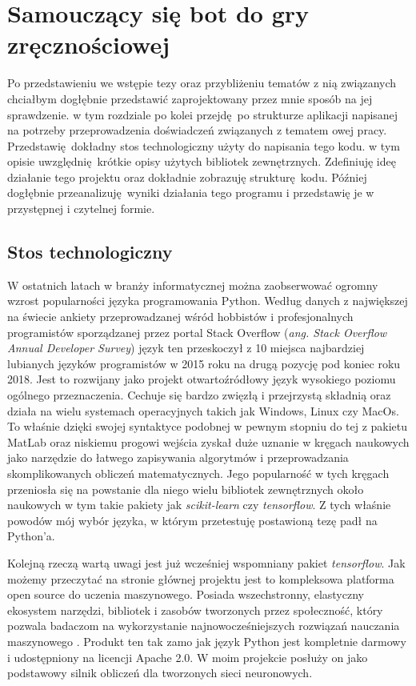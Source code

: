 \documentclass[12pt, oneside, a4paper]{report}
\begin{document}

\chapter{Samouczący się bot do gry zręcznościowej}

Po przedstawieniu we wstępie tezy oraz przybliżeniu tematów z nią związanych chciałbym dogłębnie przedstawić zaprojektowany przez mnie sposób na jej sprawdzenie. w tym rozdziale po kolei przejdę po strukturze aplikacji napisanej na potrzeby przeprowadzenia doświadczeń związanych z tematem owej pracy. Przedstawię dokładny stos technologiczny użyty do napisania tego kodu. w tym opisie uwzględnię krótkie opisy użytych bibliotek zewnętrznych. Zdefiniuję ideę działanie tego projektu oraz dokładnie zobrazuję strukturę kodu. Później dogłębnie przeanalizuję wyniki działania tego programu i przedstawię je w przystępnej i czytelnej formie.

\section{Stos technologiczny}

W ostatnich latach w branży informatycznej można zaobserwować ogromny wzrost popularności języka programowania Python. Według danych z największej na świecie ankiety przeprowadzanej wśród hobbistów i profesjonalnych programistów sporządzanej przez portal Stack Overflow (\textit{ang. Stack Overflow Annual Developer Survey}) \citep{stackoverflow-survey} język ten przeskoczył z 10 miejsca najbardziej lubianych języków programistów w 2015 roku na drugą pozycję pod koniec roku 2018. Jest to rozwijany jako projekt otwartoźródłowy język wysokiego poziomu ogólnego przeznaczenia. Cechuje się bardzo zwięzłą i przejrzystą składnią oraz działa na wielu systemach operacyjnych takich jak Windows, Linux czy MacOs. To właśnie dzięki swojej syntaktyce podobnej w pewnym stopniu do tej z pakietu MatLab oraz niskiemu progowi wejścia zyskał duże uznanie w kręgach naukowych jako narzędzie do łatwego zapisywania algorytmów i przeprowadzania skomplikowanych obliczeń matematycznych. Jego popularność w tych kręgach przeniosła się na powstanie dla niego wielu bibliotek zewnętrznych około naukowych w tym takie pakiety jak \textit{scikit-learn} czy \textit{tensorflow}. Z tych właśnie powodów mój wybór języka, w którym przetestuję postawioną tezę padł na Python'a.

Kolejną rzeczą wartą uwagi jest już wcześniej wspomniany pakiet \textit{tensorflow}. Jak możemy przeczytać na stronie głównej projektu jest to kompleksowa platforma open source do uczenia maszynowego. Posiada wszechstronny, elastyczny ekosystem narzędzi, bibliotek i zasobów tworzonych przez społeczność, który pozwala badaczom na wykorzystanie najnowocześniejszych rozwiązań nauczania maszynowego \citep{tensorflow-wesite}. Produkt ten tak zamo jak język Python jest kompletnie darmowy i udostępniony na licencji Apache 2.0. W moim projekcie posłuży on jako podstawowy silnik obliczeń dla tworzonych sieci neuronowych.
\end{document}
